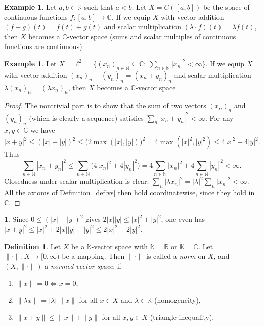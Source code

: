 \documentclass[11pt,a4paper]{article}
\numberwithin{equation}{section}
\newcommand{\N}{\mathbb{N}}
\newcommand{\R}{\mathbb{R}}
\newcommand{\C}{\mathbb{C}}
\newcommand{\K}{\mathbb{K}}
\theoremstyle{plain}
\theoremstyle{definition}
\newtheorem{definition}[theorem]{Definition}
\newtheorem{example}[theorem]{Example}
\newcommand{\thistheoremname}{}
\theoremstyle{plain}
\theoremstyle{definition}
\newtheorem*{addeddef*}{\thistheoremname}
\newenvironment{addeddef}[1]{\renewcommand{\thistheoremname}{#1}\begin{addeddef*}}{\end{addeddef*}}
\begin{document}
\begin{example}
Let $a,b\in\R$ such that $a<b$. Let $X=C([a,b])$ be the space of continuous functions
$f:[a,b]\to\C$. If we equip $X$ with vector addition $(f+g)(t)=f(t)+g(t)$ and scalar
multiplication $(\lambda\cdot f)(t)=\lambda f(t)$, then $X$ becomes a $\C$-vector space
(sums and scalar multiples of continuous functions are continuous).
\end{example}

\begin{example}\label{ex:l2}
Let $X=\ell^2=\{(x_n)_{n\in\N}\subseteq\C:\ \sum_{n\in\N}|x_n|^2<\infty\}$. If we equip $X$
with vector addition $(x_n)_n+(y_n)_n=(x_n+y_n)_n$ and scalar multiplication
$\lambda(x_n)_n=(\lambda x_n)_n$, then $X$ becomes a $\C$-vector space.
\end{example}

\begin{proof}
The nontrivial part is to show that the sum of two vectors $(x_n)_n$ and $(y_n)_n$ (which
is clearly a sequence) satisfies $\sum_{n}|x_n+y_n|^2<\infty$. For any $x,y\in\C$ we have
\[
|x+y|^2\leqslant(|x|+|y|)^2\leqslant\big(2\max(|x|,|y|)\big)^2=4\max(|x|^2,|y|^2)
\leqslant4|x|^2+4|y|^2 .
\]
Thus
\[
\sum_{n\in\N}|x_n+y_n|^2\leqslant\sum_{n\in\N}\big(4|x_n|^2+4|y_n|^2\big)
=4\sum_{n\in\N}|x_n|^2+4\sum_{n\in\N}|y_n|^2<\infty .
\]
Closedness under scalar multiplication is clear:
$\sum_n|\lambda x_n|^2=|\lambda|^2\sum_n|x_n|^2<\infty$. All the axioms of
Definition~\ref{def:vs} then hold coordinatewise, since they hold in $\C$.
\end{proof}

\begin{addeddef}{Remark 1.4a (sharper constant)}
Since $0\le(|x|-|y|)^2$ gives $2|x||y|\le|x|^2+|y|^2$, one even has
$|x+y|^2\le|x|^2+2|x||y|+|y|^2\le 2|x|^2+2|y|^2$.
\end{addeddef}

\begin{definition}
Let $X$ be a $\K$-vector space with $\K=\R$ or $\K=\C$. Let $\|\cdot\|:X\to[0,\infty)$ be a
mapping. Then $\|\cdot\|$ is called a \emph{norm} on $X$, and $(X,\|\cdot\|)$ a
\emph{normed vector space}, if
\begin{enumerate}
\item $\|x\|=0\iff x=0$,
\item $\|\lambda x\|=|\lambda|\,\|x\|$ for all $x\in X$ and $\lambda\in\K$ (homogeneity),
\item $\|x+y\|\leqslant\|x\|+\|y\|$ for all $x,y\in X$ (triangle inequality).
\end{enumerate}
\end{definition}
\end{document}
